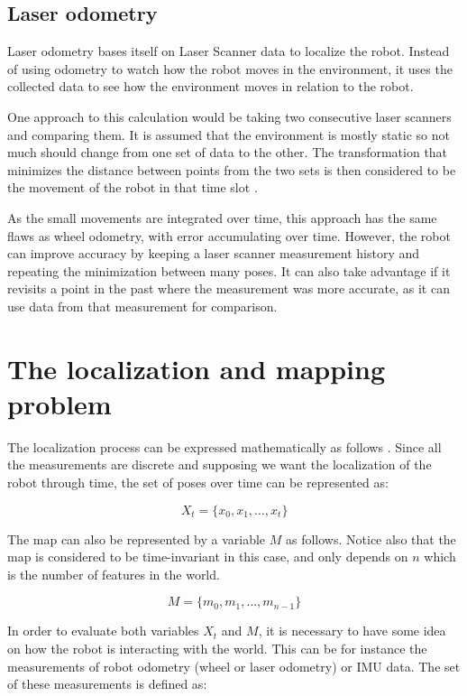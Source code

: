 \subsection{Laser odometry}

Laser odometry bases itself on Laser Scanner data to localize the robot. Instead of using odometry to watch how the robot moves in the environment, it uses the collected data to see how the environment moves in relation to the robot.

One approach to this calculation would be taking two consecutive laser scanners and comparing them. It is assumed that the environment is mostly static so not much should change from one set of data to the other. The transformation that minimizes the distance between points from the two sets is then considered to be the movement of the robot in that time slot \cite{Jaimez_et_al_ICRA2016}.

As the small movements are integrated over time, this approach has the same flaws as wheel odometry, with error accumulating over time. However, the robot can improve accuracy by keeping a laser scanner measurement history and repeating the minimization between many poses. It can also take advantage if it revisits a point in the past where the measurement was more accurate, as it can use data from that measurement for comparison.

\section{The localization and mapping problem}

The localization process can be expressed mathematically as follows \cite{thrun2005probabilistic}. Since all the measurements are discrete and supposing we want the localization of the robot through time, the set of poses over time can be represented as:

\begin{equation}\label{eq:x}
    X_t = \{x_0, x_1, \dots, x_t\} 
\end{equation}

The map can also be represented by a variable $M$ as follows. Notice also that the map is considered to be time-invariant in this case, and only depends on $n$ which is the number of features in the world.

\begin{equation}
    M = \{m_0, m_1, \dots, m_{n - 1}\}
\end{equation}

In order to evaluate both variables $X_t$ and $M$, it is necessary to have some idea on how the robot is interacting with the world. This can be for instance the measurements of robot odometry (wheel or laser odometry) or IMU data. The set of these measurements is defined as:


